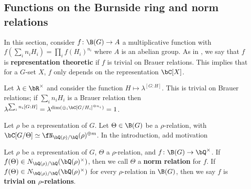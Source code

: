 \subsection{Functions on the Burnside ring and norm relations}\label{sec-norm-rels}

In this section, consider $f \colon \B(G) \to A$ a multiplicative function with $f(\sum_i n_i H_i) = \prod_i f(H_i)^{n_i}$ where $A$ is an abelian group. As in \cite{reg-const}, we say that $f$ is \textbf{representation theoretic} if $f$ is trivial on Brauer relations. This implies that for a $G$-set $X$, $f$ only depends on the representation $\bC[X]$. 

\begin{example}
  Let $\lambda \in \bR^{\times}$ and consider the function $H \mapsto \lambda^{[G : H]}$. This is trivial on Brauer relations;  if $\sum_i n_i H_i$ is a Brauer relation then $\lambda^{\sum_i n_i [G : H]} = \lambda^{\dim( \oplus_i \bC[G / H_i]^{\oplus n_i})} = 1$.
\end{example}

Let $\rho$ be a representation of $G$. Let $\Theta \in \B(G)$ be a $\rho$-relation, with $\bC[G / \Theta] \simeq \repnorm{\rho}^{\oplus m}$. In the introduction, {\color{red} add motivation}

\begin{defn}
Let $\rho$ be a representation of $G$, $\Theta$ a $\rho$-relation, and $f \colon \B(G) \to \bQ^{\times}$. If $f(\Theta) \in \fieldnorm{\rho}$, then we call $\Theta$ a \textbf{norm relation} for $f$. 
If $f(\Theta) \in \fieldnorm{\rho}$ for every $\rho$-relation in $\B(G)$, then we say $f$ is \textbf{trivial on $\rho$-relations}.

\end{defn}



